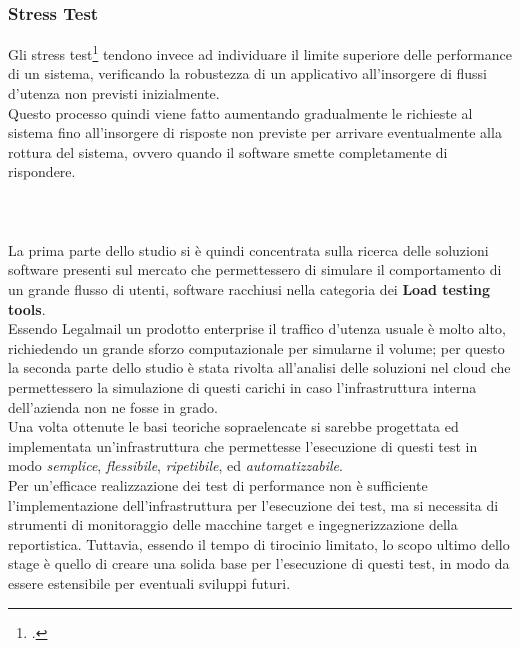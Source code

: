 \subsubsection{Stress Test}
Gli stress test\footcite{article:stresstest} tendono invece ad individuare il limite superiore delle performance di un sistema, verificando la robustezza di un applicativo all'insorgere di flussi d'utenza non previsti inizialmente. \\
Questo processo quindi viene fatto aumentando gradualmente le richieste al sistema fino all'insorgere di risposte non previste per arrivare eventualmente alla rottura del sistema, ovvero quando il software smette completamente di rispondere. \\\\\\\\
La prima parte dello studio si è quindi concentrata sulla ricerca delle soluzioni software presenti sul mercato che permettessero di simulare il comportamento di un grande flusso di utenti, software racchiusi nella categoria dei \textbf{Load testing tools}. \\
Essendo Legalmail un prodotto enterprise il traffico d'utenza usuale è molto alto, richiedendo un grande sforzo computazionale per simularne il volume; per questo la seconda parte dello studio è stata rivolta all'analisi delle soluzioni nel \gls{cloud} che permettessero la simulazione di questi carichi in caso l'infrastruttura interna dell'azienda non ne fosse in grado. \\
Una volta ottenute le basi teoriche sopraelencate si sarebbe progettata ed implementata un'infrastruttura che permettesse l'esecuzione di questi test in modo \textit{semplice}, \textit{flessibile}, \textit{ripetibile}, ed \textit{automatizzabile}.\\
Per un'efficace realizzazione dei test di performance non è sufficiente l'implementazione dell'infrastruttura per l'esecuzione dei test, ma si necessita di strumenti di monitoraggio delle macchine target e ingegnerizzazione della reportistica. Tuttavia, essendo il tempo di tirocinio limitato, lo scopo ultimo dello stage è quello di creare una solida base per l'esecuzione di questi test, in modo da essere estensibile per eventuali sviluppi futuri.


